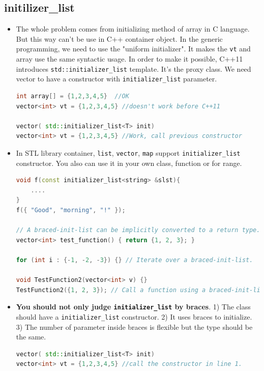 \documentclass[a4paper,11pt,twoside]{book}
\begin{document}
\subsection{initilizer\_list}
\begin{itemize}
	\item The whole problem comes from initializing method of array in C language. But this way can't be use in C++ container object. In the generic programming, we need to use the "uniform initializer". It  makes the \texttt{vt} and array use the same syntactic usage. In order to make it possible, C++11 introduces \texttt{std::initializer\_list} template. It's the proxy class. We need vector to have a constructor with \texttt{initializer\_list} parameter.
\begin{lstlisting}[frame=single, language=c++,mathescape=true]
int array[] = {1,2,3,4,5}  //OK 
vector<int> vt = {1,2,3,4,5} //doesn't work before C++11 

vector( std::initializer_list<T> init)
vector<int> vt = {1,2,3,4,5} //Work, call previous constructor
\end{lstlisting}
		
	\item In STL library container, \texttt{list}, \texttt{vector}, \texttt{map} support \texttt{initializer\_list} constructor. You also can use it in your own class, function or for range.
\begin{lstlisting}[frame=single, language=c++,mathescape=true]
void f(const initializer_list<string> &slst){
	....
}
f({ "Good", "morning", "!" });
	
// A braced-init-list can be implicitly converted to a return type.
vector<int> test_function() { return {1, 2, 3}; }
	
for (int i : {-1, -2, -3}) {} // Iterate over a braced-init-list.
	
void TestFunction2(vector<int> v) {}
TestFunction2({1, 2, 3}); // Call a function using a braced-init-list.
\end{lstlisting}

	\item  \textbf{You should not only judge \texttt{initializer\_list} by braces}. 1) The class should have a \texttt{initializer\_list} constructor. 2) It uses braces to initialize. 3) The number of parameter inside braces is flexible but the type should be the same.

\begin{lstlisting}[frame=single, language=c++,mathescape=true]
vector( std::initializer_list<T> init)
vector<int> vt = {1,2,3,4,5} //call the constructor in line 1.
	

\end{lstlisting}
\end{itemize}
\end{document}
